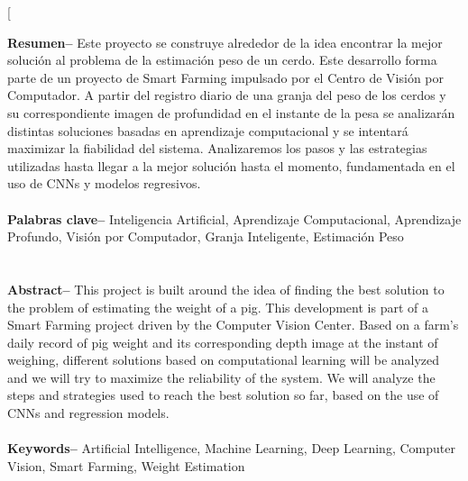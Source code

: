 ﻿\documentclass[10pt,a4paper,twocolumn,twoside]{article}
\begin{document}
\twocolumn[\begin{@twocolumnfalse}


\maketitle

\thispagestyle{primerapagina}
\begin{center}
\parbox{0.915\textwidth}
{\sffamily
\textbf{Resumen--}
Este proyecto se construye alrededor de la idea encontrar la mejor solución al problema de la estimación peso de un cerdo. Este desarrollo forma parte de un proyecto de Smart Farming impulsado por el Centro de Visión por Computador.
A partir del registro diario de una granja del peso de los cerdos y su correspondiente imagen de profundidad en el instante de la pesa se analizarán distintas soluciones basadas en aprendizaje computacional y se intentará maximizar la fiabilidad del sistema.
Analizaremos los pasos y las estrategias utilizadas hasta llegar a la mejor solución hasta el momento, fundamentada en el uso de CNNs y modelos regresivos.
\\
\\
\textbf{Palabras clave-- } Inteligencia Artificial, Aprendizaje Computacional, Aprendizaje Profundo, Visión por Computador, Granja Inteligente, Estimación Peso\\
\\
\bigskip
\\
\textbf{Abstract--} This project is built around the idea of finding the best solution to the problem of estimating the weight of a pig. This development is part of a Smart Farming project driven by the Computer Vision Center.
Based on a farm's daily record of pig weight and its corresponding depth image at the instant of weighing, different solutions based on computational learning will be analyzed and we will try to maximize the reliability of the system.
We will analyze the steps and strategies used to reach the best solution so far, based on the use of CNNs and regression models.
\\
\\
\textbf{Keywords-- } Artificial Intelligence, Machine Learning, Deep Learning, Computer Vision, Smart Farming, Weight Estimation\\
}


\end{center}
\end{@twocolumnfalse}
\end{document}
